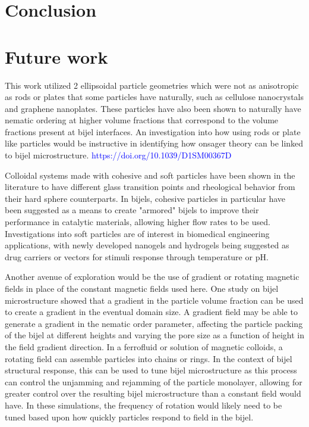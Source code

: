 \section{Conclusion}

\section{Future work}

This work utilized 2 ellipsoidal particle geometries which were not as anisotropic as rods or plates that some particles have naturally, such as cellulose nanocrystals and graphene nanoplates. These particles have also been shown to naturally have nematic ordering at higher volume fractions that correspond to the volume fractions present at bijel interfaces. An investigation into how using rods or plate like particles would be instructive in identifying how onsager theory can be linked to bijel microstructure. \textcolor{blue}{https://doi.org/10.1039/D1SM00367D}

Colloidal systems made with cohesive and soft particles have been shown in the literature to have different glass transition points and rheological behavior from their hard sphere counterparts. In bijels, cohesive particles in particular have been suggested as a means to create "armored" bijels to improve their performance in catalytic materials, allowing higher flow rates to be used. Investigations into soft particles are of interest in biomedical engineering applications, with newly developed nanogels and hydrogels being suggested as drug carriers or vectors for stimuli response through temperature or pH.

Another avenue of exploration would be the use of gradient or rotating magnetic fields in place of the constant magnetic fields used here. One study on bijel microstructure showed that a gradient in the particle volume fraction can be used to create a gradient in the eventual domain size. A gradient field may be able to generate a gradient in the nematic order parameter, affecting the particle packing of the bijel at different heights and varying the pore size as a function of height in the field gradient direction. In a ferrofluid or solution of magnetic colloids, a rotating field can assemble particles into chains or rings. In the context of bijel structural response, this can be used to tune bijel microstructure as this process can control the unjamming and rejamming of the particle monolayer, allowing for greater control over the resulting bijel microstructure than a constant field would have. In these simulations, the frequency of rotation would likely need to be tuned based upon how quickly particles respond to field in the bijel.

